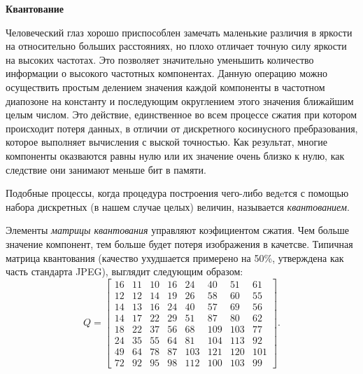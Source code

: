 \documentclass{matmex-diploma-custom}
\begin{document}
\textbf{Квантование}\newline

Человеческий глаз  хорошо приспособлен замечать маленькие различия в яркости на относительно больших расстояниях, но плохо отличает точную силу яркости на высоких частотах. Это позволяет значительно уменьшить количество информации о высокого частотных компонентах. Данную операцию можно  осуществить простым делением значения  каждой компоненты в частотном диапозоне на константу и последующим округлением этого значения ближайшим целым числом. Это действие, единственное во всем процессе сжатия при котором происходит потеря данных, в отличии от дискретного косинусного пребразования, которое выполняет вычисления с выской точностью. Как результат, многие компоненты оказваются равны  нулю или их значение очень близко к нулю, как следствие они занимают меньше бит в памяти.

Подобные процессы, когда процедура построения чего-либо ведeтся с помощью набора дискретных (в нашем случае целых) величин, называется \emph{квантованием}.

Элементы \emph{матрицы квантования} управляют коэфициентом сжатия. Чем больше значение компонент, тем больше будет потеря изображения в качетсве. Типичная матрица квантования (качество ухудшается примерено на 50\%, утверждена как часть стандарта JPEG), выглядит следующим образом:
$$ Q=
     \begin{bmatrix}
      16 & 11 & 10 & 16 & 24 & 40 & 51 & 61 \\
      12 & 12 & 14 & 19 & 26 & 58 & 60 & 55 \\
      14 & 13 & 16 & 24 & 40 & 57 & 69 & 56 \\
      14 & 17 & 22 & 29 & 51 & 87 & 80 & 62 \\
      18 & 22 & 37 & 56 & 68 & 109 & 103 & 77 \\
      24 & 35 & 55 & 64 & 81 & 104 & 113 & 92 \\
      49 & 64 & 78 & 87 & 103 & 121 & 120 & 101 \\
      72 & 92 & 95 & 98 & 112 & 100 & 103 & 99
     \end{bmatrix}.
$$
\end{document}

